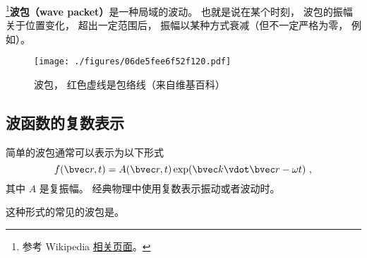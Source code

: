 

\footnote{参考 Wikipedia \href{https://en.wikipedia.org/wiki/Wave_packet}{相关页面}。}\textbf{波包（wave packet）}是一种局域的波动。 也就是说在某个时刻， 波包的振幅关于位置变化， 超出一定范围后， 振幅以某种方式衰减（但不一定严格为零， 例如）。

\begin{figure}[ht]
\centering
\texttt{[image: ./figures/06de5fee6f52f120.pdf]}
\caption{波包， 红色虚线是包络线（来自维基百科）} \label{fig_WvPck_1}
\end{figure}

\subsection{波函数的复数表示}
简单的波包通常可以表示为以下形式
\begin{equation}
f(\bvec r, t) = A(\bvec r, t) \exp(\bvec k \vdot \bvec r - \omega t)~,
\end{equation}
其中 $A$ 是复振幅。 经典物理中使用复数表示振动或者波动时。

这种形式的常见的波包是。
